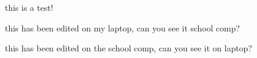 this is a test!

this has been edited on my laptop, can you see it school comp?

this has been edited on the school comp, can you see it on laptop?
